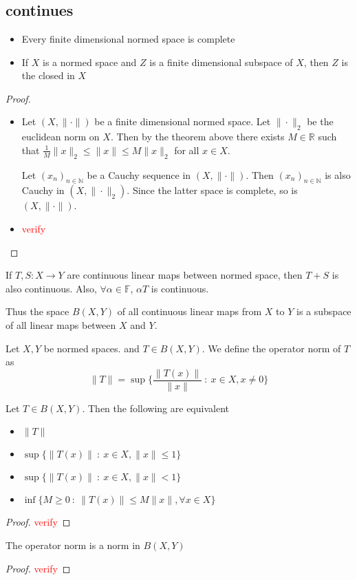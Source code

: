 
\chapter{}
\section{continues}
\begin{corollary}
  \begin{itemize}
    \item Every finite dimensional normed space is complete
    \item If $X$ is a normed space and $Z$ is a finite dimensional subspace of $X$, then $Z$ is the closed in $X$
  \end{itemize}
\end{corollary}
\begin{proof}
  \begin{itemize}
    \item Let $(X, \|\cdot\|)$ be a finite dimensional normed space. Let $\|\cdot\|_2$ be the euclidean norm on $X$. Then by the theorem above there exists $M \in \mathbb{R}$ such that $\frac{1}{M}\|x\|_2 \le \|x\| \le M \|x\|_2 $ for all $x \in X$.

      Let  $(x_n)_{n \in \mathbb{N}}$ be a Cauchy sequence in $(X, \|\cdot\|)$. Then $(x_n)_{ n \in \mathbb{N}} $ is also Cauchy in $(X, \|\cdot\|_2)$. Since the latter space is complete, so is $(X, \|\cdot\|)$.
   \item \textcolor{red}{verify}
  \end{itemize}
\end{proof}
\begin{note}
  If $T, S : X \to Y$ are continuous linear maps between normed space, then $T+S$ is also continuous. Also, $\forall \alpha \in \mathbb{F}$, $\alpha T$ is continuous.

  Thus the space $B(X, Y)$ of all continuous linear maps from $X$ to $Y$ is a subspace of all linear maps between $X$ and $Y$.
\end{note}

\begin{definition}
  Let $X, Y$ be normed spaces. and $T \in B(X, Y)$. We define the operator norm of $T$ as \[
    \|T\| = \sup \Big \{ \frac{\|T(x)\|}{\|x\|} \ : \ x \in X, x \neq 0 \Big \}
  \]
\end{definition}

\begin{lemma}
  Let $T \in B(X, Y)$. Then the following are equivalent
  \begin{itemize}
    \item $\|T\|$
    \item $\sup \{ \|T(x)\| \ : \ x \in X , \|x\| \le 1 \}$
    \item $\sup \{ \|T(x)\| \ : \ x \in X , \|x\| < 1 \}$
    \item $\inf \{ M \ge 0 \ : \ \|T(x)\| \le M \|x\|, \forall x \in X \}$
  \end{itemize}
\end{lemma}
\begin{proof}
  \textcolor{red}{verify}
\end{proof}

\begin{proposition}
  The operator norm is a norm in $B(X, Y)$
\end{proposition}
\begin{proof}
   \textcolor{red}{verify}
\end{proof}
